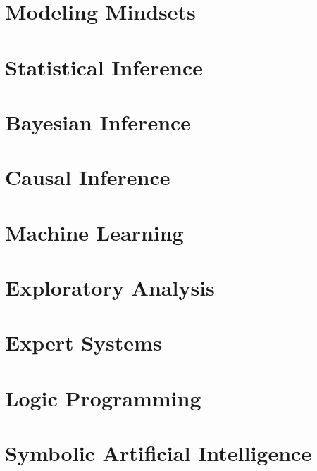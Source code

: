 \documentclass[
  10pt,
]{scrbook}
\begin{document}
\hypertarget{modeling-mindsets}{%
\chapter{Modeling Mindsets}\label{modeling-mindsets}}

\hypertarget{statistical-inference}{%
\chapter{Statistical Inference}\label{statistical-inference}}

\hypertarget{bayesian-inference}{%
\chapter{Bayesian Inference}\label{bayesian-inference}}

\hypertarget{causal-inference}{%
\chapter{Causal Inference}\label{causal-inference}}

\hypertarget{machine-learning}{%
\chapter{Machine Learning}\label{machine-learning}}

\hypertarget{exploratory-analysis}{%
\chapter{Exploratory Analysis}\label{exploratory-analysis}}

\hypertarget{expert-systems}{%
\chapter{Expert Systems}\label{expert-systems}}

\hypertarget{logic-programming}{%
\chapter{Logic Programming}\label{logic-programming}}

\hypertarget{symbolic-artificial-intelligence}{%
\chapter{Symbolic Artificial Intelligence}\label{symbolic-artificial-intelligence}}

\printindex
\thispagestyle{empty}
\end{document}
